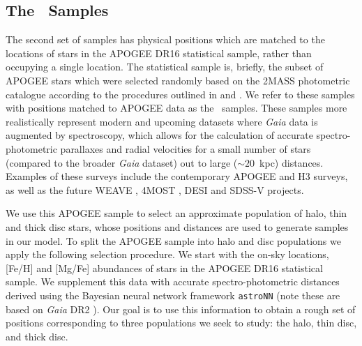 \subsection{The \survey\ Samples}
\label{ch2:subsec:TheSurveySamples}

The second set of samples has physical positions which are matched to the locations of stars in the APOGEE DR16 \parencite{apogeedr16} statistical sample, rather than occupying a single location. The statistical sample is, briefly, the subset of APOGEE stars which were selected randomly based on the 2MASS photometric catalogue according to the procedures outlined in \textcite[][APOGEE-1]{zasowski13} and \textcite[][APOGEE-2]{zasowski17}. We refer to these samples with positions matched to APOGEE data as the \survey\ samples. These samples more realistically represent modern and upcoming datasets where \textit{Gaia} data is augmented by spectroscopy, which allows for the calculation of accurate spectro-photometric parallaxes \parencite[e.g.,][]{leung19b} and radial velocities for a small number of stars (compared to the broader \textit{Gaia} dataset) out to large ($\sim 20$~kpc) distances. Examples of these surveys include the contemporary APOGEE \parencite{apogeedr16} and H3 \parencite{h3} surveys, as well as the future WEAVE \parencite{weave}, 4MOST \parencite{4most}, DESI \parencite{desi} and SDSS-V \parencite{sdss5} projects.

We use this APOGEE sample to select an approximate population of halo, thin and thick disc stars, whose positions and distances are used to generate samples in our model. To split the APOGEE sample into halo and disc populations we apply the following selection procedure. We start with the on-sky locations, [Fe/H] and [Mg/Fe] abundances of stars in the APOGEE DR16 statistical sample. We supplement this data with accurate spectro-photometric distances derived using the Bayesian neural network framework \texttt{astroNN} \parencite{leung19a,leung19b} (note these are based on \textit{Gaia} DR2 \parencite{gaiadr2}). Our goal is to use this information to obtain a rough set of positions corresponding to three populations we seek to study: the halo, thin disc, and thick disc.

